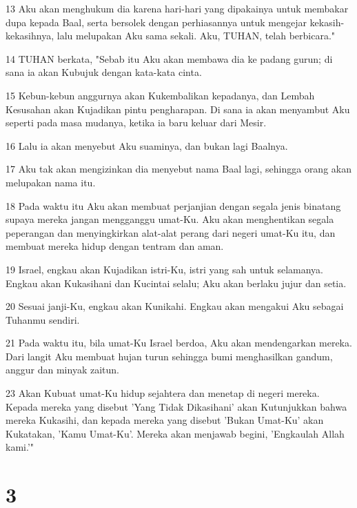 \par 13 Aku akan menghukum dia karena hari-hari yang dipakainya untuk membakar dupa kepada Baal, serta bersolek dengan perhiasannya untuk mengejar kekasih-kekasihnya, lalu melupakan Aku sama sekali. Aku, TUHAN, telah berbicara."
\par 14 TUHAN berkata, "Sebab itu Aku akan membawa dia ke padang gurun; di sana ia akan Kubujuk dengan kata-kata cinta.
\par 15 Kebun-kebun anggurnya akan Kukembalikan kepadanya, dan Lembah Kesusahan akan Kujadikan pintu pengharapan. Di sana ia akan menyambut Aku seperti pada masa mudanya, ketika ia baru keluar dari Mesir.
\par 16 Lalu ia akan menyebut Aku suaminya, dan bukan lagi Baalnya.
\par 17 Aku tak akan mengizinkan dia menyebut nama Baal lagi, sehingga orang akan melupakan nama itu.
\par 18 Pada waktu itu Aku akan membuat perjanjian dengan segala jenis binatang supaya mereka jangan mengganggu umat-Ku. Aku akan menghentikan segala peperangan dan menyingkirkan alat-alat perang dari negeri umat-Ku itu, dan membuat mereka hidup dengan tentram dan aman.
\par 19 Israel, engkau akan Kujadikan istri-Ku, istri yang sah untuk selamanya. Engkau akan Kukasihani dan Kucintai selalu; Aku akan berlaku jujur dan setia.
\par 20 Sesuai janji-Ku, engkau akan Kunikahi. Engkau akan mengakui Aku sebagai Tuhanmu sendiri.
\par 21 Pada waktu itu, bila umat-Ku Israel berdoa, Aku akan mendengarkan mereka. Dari langit Aku membuat hujan turun sehingga bumi menghasilkan gandum, anggur dan minyak zaitun.
\par 23 Akan Kubuat umat-Ku hidup sejahtera dan menetap di negeri mereka. Kepada mereka yang disebut 'Yang Tidak Dikasihani' akan Kutunjukkan bahwa mereka Kukasihi, dan kepada mereka yang disebut 'Bukan Umat-Ku' akan Kukatakan, 'Kamu Umat-Ku'. Mereka akan menjawab begini, 'Engkaulah Allah kami.'"

\chapter{3}

